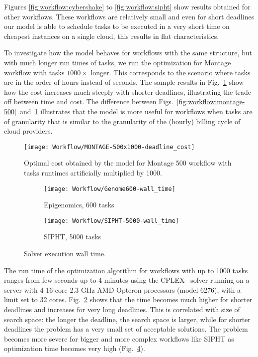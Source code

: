 {    Figures \ref{fig:workflow:cybershake} to \ref{fig:workflow:sipht} show results obtained for other workflows. These workflows are relatively small and even for short deadlines our model is able to schedule tasks to be executed in a very short time on cheapest instances on a single cloud, this results in flat characteristics.
    
    To investigate how the model behaves for workflows with the same structure, but with much longer run times of tasks, we run the optimization for Montage workflow with tasks $1000 \times$ longer. This corresponds to the scenario where tasks are in the order of hours instead of seconds. The sample results in Fig.~\ref{fig:workflow:montage-500x1000} show how the cost increases much steeply with shorter deadlines, illustrating the trade-off between time and cost. The difference between Figs.~\ref{fig:workflow:montage-500}~and~\ref{fig:workflow:montage-500x1000} illustrates that the model is more useful for workflows when tasks are of granularity that is similar to the granularity of the (hourly) billing cycle of cloud providers.    

    \begin{figure}[tb]
       \centering \texttt{[image: Workflow/MONTAGE-500x1000-deadline\_cost]}
       \caption{Optimal cost obtained by the model for Montage 500 workflow with tasks runtimes artificially 
       multiplied by 1000.
       \label{fig:workflow:montage-500x1000}}
    \end{figure}

    \begin{figure}[tb] 
       \centering
       
       \begin{subfigure}[b]{0.7\textwidth}  
         \texttt{[image: Workflow/Genome600-wall\_time]}
         \caption{Epigenomics, 600 tasks}
         \label{fig:workflow:genome-600-opttime}
       \end{subfigure}
       \begin{subfigure}[b]{0.7\textwidth}
         \texttt{[image: Workflow/SIPHT-5000-wall\_time]}
         \caption{SIPHT, 5000 tasks}
         \label{fig:workflow:sipht-5000-opttime}
       \end{subfigure}
       
       \caption{Solver execution wall time.}
    \end{figure}
  
    
    The run time of the optimization algorithm for workflows with up to 1000 tasks ranges from few seconds up to 4 minutes using the CPLEX~\cite{cplex} solver running on a server with 4 16-core 2.3 GHz AMD Opteron processors (model 6276), with a limit set to 32 cores. Fig.~\ref{fig:workflow:genome-600-opttime} shows that the time becomes much higher for shorter deadlines and increases for very long deadlines. This is correlated with size of search space: the longer the deadline, the search space is larger, while for shorter deadlines the problem has a very small set of acceptable solutions.  The problem becomes more severe for bigger and more complex workflows like SIPHT as optimization time becomes very high (Fig.~\ref{fig:workflow:sipht-5000-opttime}).
    
}
